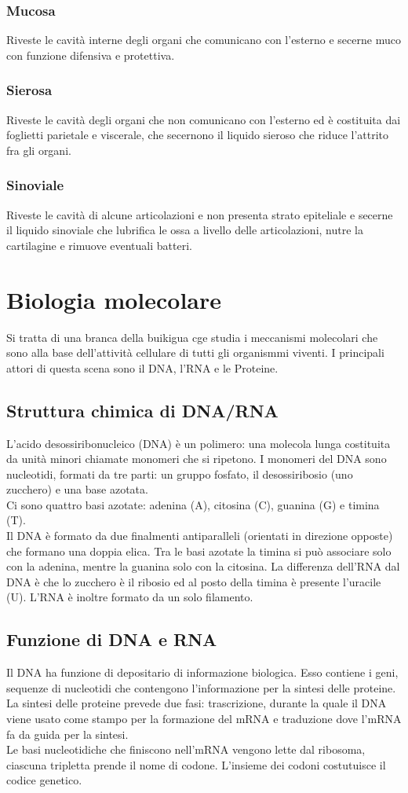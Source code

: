 \documentclass[a4paper]{article}
\begin{document}
\subsubsection{Mucosa}
Riveste le cavità interne degli organi che comunicano con l’esterno e secerne 
muco con funzione difensiva e protettiva.
\subsubsection{Sierosa}
Riveste le cavità degli organi che non comunicano con l’esterno ed è costituita
dai foglietti parietale e viscerale, che secernono il liquido sieroso che 
riduce l’attrito fra gli organi.
\subsubsection{Sinoviale}
Riveste le cavità di alcune articolazioni e non presenta strato epiteliale e 
secerne il liquido sinoviale che lubrifica le ossa a livello delle 
articolazioni, nutre la cartilagine e rimuove eventuali batteri.

\section{Biologia molecolare}
Si tratta di una branca della buikigua cge studia i meccanismi molecolari che 
sono alla base dell'attività cellulare di tutti gli organismmi viventi. I 
principali attori di questa scena sono il DNA, l'RNA e le Proteine.
\subsection{Struttura chimica di DNA/RNA}
L'acido desossiribonucleico (DNA) è un polimero: una molecola lunga costituita
da unità minori chiamate monomeri che si ripetono. I monomeri del DNA sono 
nucleotidi, formati da tre parti: un gruppo fosfato, il desossiribosio (uno
zucchero) e una base azotata. \\ 
Ci sono quattro basi azotate: adenina (A), citosina (C), guanina (G) e timina 
(T). \\
Il DNA è formato da due finalmenti antiparalleli (orientati in direzione 
opposte) che formano una doppia elica. Tra le basi azotate la timina si può
associare solo con la adenina, mentre la guanina solo con la citosina.
La differenza dell'RNA dal DNA è che lo zucchero è il ribosio ed al posto della
timina è presente l'uracile (U). L'RNA è inoltre formato da un solo filamento.
\subsection{Funzione di DNA e RNA}
Il DNA ha funzione di depositario di informazione biologica. Esso contiene i
geni, sequenze di nucleotidi che contengono l'informazione per la sintesi delle
proteine. \\
La sintesi delle proteine prevede due fasi: trascrizione, durante la quale il DNA
viene usato come stampo per la formazione del mRNA e traduzione dove l'mRNA
fa da guida per la sintesi. \\ 
Le basi nucleotidiche che finiscono nell'mRNA vengono lette dal ribosoma,
ciascuna tripletta prende il nome di codone. L'insieme dei codoni costutuisce
il codice genetico.
\end{document}
